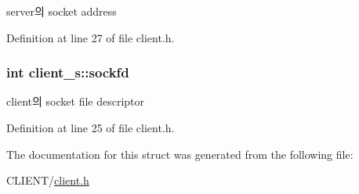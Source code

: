 server의 socket address 



Definition at line 27 of file client.\-h.

\hypertarget{structclient__s_a409a70b3071eaf5be18d0439d256756a}{
\subsubsection[{sockfd}]{\setlength{\rightskip}{0pt plus 5cm}int client\-\_\-s\-::sockfd}}\label{structclient__s_a409a70b3071eaf5be18d0439d256756a}


client의 socket file descriptor 



Definition at line 25 of file client.\-h.



The documentation for this struct was generated from the following file\-:\begin{DoxyCompactItemize}
\item 
C\-L\-I\-E\-N\-T/\hyperlink{client_8h}{client.\-h}\end{DoxyCompactItemize}

